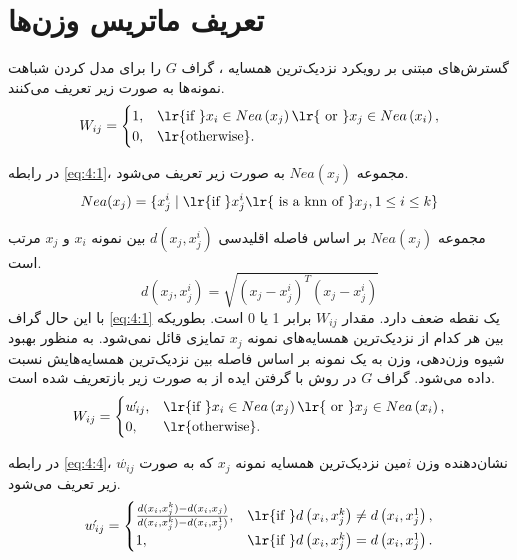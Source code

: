 \section{تعریف ماتریس وزن‌ها}\label{sec:4:3}
گسترش‌های  مبتنی بر رویکرد نزدیک‌ترین همسایه \cite{ye2012,pan2015,xu2016}، گراف $G$ را برای مدل کردن شباهت نمونه‌ها به صورت زیر تعریف می‌کنند.
\begin{equation}\label{eq:4:1}
W_{ij} =
\begin{cases}
1, & \textrm{\lr{if }} x_i \in Nea\left(x_j\right) \textrm{\lr{ or }} x_j \in Nea\left(x_i\right),  \\
0, & \textrm{\lr{otherwise}}.
\end{cases}
\end{equation}

در رابطه \ref{eq:4:1}، مجموعه $Nea\left(x_j\right)$ به صورت زیر تعریف می‌شود.
\begin{equation}\label{eq:4:2}
Nea(x_j) = \{x^{i}_{j} \mid \textrm{\lr{if }} x^{i}_{j} \textrm{\lr{ is a knn of }} x_{j} ,1 \leq i \leq k \}
\end{equation}

مجموعه $Nea\left(x_j\right)$  بر اساس فاصله اقلیدسی $d(x_{j},x^{i}_{j})$ بین نمونه $x_{i}$ و $x_{j}$  مرتب است.
\begin{equation}\label{eq:4:3}
d(x_{j},x^{i}_{j})= \sqrt{(x_{j} - x^{i}_{j})^{T}(x_{j} - x^{i}_{j})}
\end{equation}
با این حال گراف \ref{eq:4:1} یک نقطه ضعف دارد. مقدار $W_{ij}$ برابر 1 یا 0 است. بطوریکه بین هر کدام از نزدیک‌ترین همسایه‌های نمونه $x_j$ تمایزی قائل نمی‌شود. به منظور بهبود شیوه وزن‌دهی، وزن به یک نمونه بر اساس فاصله بین نزدیک‌ترین همسایه‌هایش نسبت داده می‌شود. گراف $G$ در روش  با گرفتن ایده از \cite{dudani1976,gou2012} به صورت زیر بازتعریف شده است.
\begin{equation}\label{eq:4:4}
W_{ij} =
\begin{cases}
\acute{w_{ij}}, & \textrm{\lr{if }} x_{i} \in Nea\left(x_{j}\right) \textrm{\lr{ or }} x_j \in Nea\left(x_i\right), \\
0, & \textrm{\lr{otherwise}}.
\end{cases}
\end{equation}

در رابطه \ref{eq:4:4}، $\acute{w_{ij}}$  نشان‌دهنده وزن  $i$مین نزدیک‌ترین همسایه نمونه $x_{j}$  که به صورت زیر تعریف می‌شود.
\begin{equation}\label{eq:4:5}
\acute{w_{ij}} =
\begin{cases}
\frac{d(x_{i},x^{k}_{j}) - d(x_{i},x_{j})}{d(x_{i},x^{k}_{j}) - d(x_{i},x^{1}_{j})}, & \textrm{\lr{if }} d\left(x_{i},x^{k}_{j} \right) \neq d\left(x_{i},x^{1}_{j} \right),  \\
1, & \textrm{\lr{if }} d\left(x_{i},x^{k}_{j} \right) = d\left(x_{i},x^{1}_{j} \right).
\end{cases}
\end{equation}


